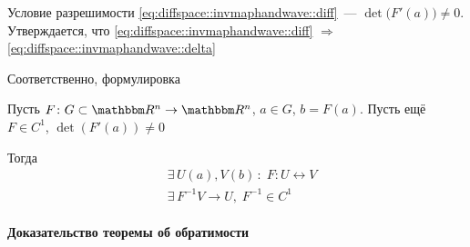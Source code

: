 \documentclass[12pt,timbord]{../../../notes}
\begin{document}
Условие разрешимости \eqref{eq:diffspace::invmaphandwave::diff}~--- $\det\bigl(F'(a)\bigr) \neq 0$.
Утверждается, что \eqref{eq:diffspace::invmaphandwave::diff} $\Rightarrow$
\eqref{eq:diffspace::invmaphandwave::delta}

Соответственно, формулировка 
\begin{thrm}\label{thrm:diffspace::invmap}
  Пусть $F\colon G\subset \R^n \to \R^n$, $a\in G$, $b = F(a)$. Пусть ещё $F \in C^1$, 
  $\det(F'(a)) \neq 0$
  
  Тогда 
  \[
    \begin{split}
      & \exists\, U(a), V(b) \,\colon\; F \colon U \leftrightarrow V \\
      & \exists\, F^{-1} V\to U, \; F^{-1} \in C^1
    \end{split}
  \]
\end{thrm}

\paragraph{Доказательство теоремы об обратимости}
\label{par:diffspace::invmapproof}
\end{document}
